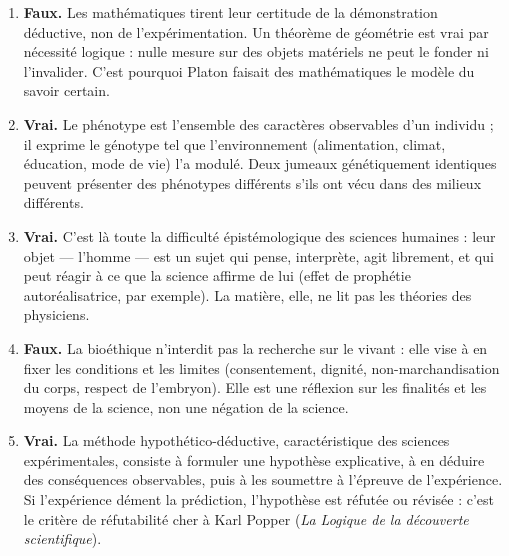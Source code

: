 \documentclass[11pt]{article}
\begin{document}
\begin{corrige}
\begin{enumerate}
\item \textbf{Faux.} Les mathématiques tirent leur certitude de la démonstration déductive, non de l'expérimentation. Un théorème de géométrie est vrai par nécessité logique : nulle mesure sur des objets matériels ne peut le fonder ni l'invalider. C'est pourquoi Platon faisait des mathématiques le modèle du savoir certain.
\item \textbf{Vrai.} Le phénotype est l'ensemble des caractères observables d'un individu ; il exprime le génotype tel que l'environnement (alimentation, climat, éducation, mode de vie) l'a modulé. Deux jumeaux génétiquement identiques peuvent présenter des phénotypes différents s'ils ont vécu dans des milieux différents.
\item \textbf{Vrai.} C'est là toute la difficulté épistémologique des sciences humaines : leur objet — l'homme — est un sujet qui pense, interprète, agit librement, et qui peut réagir à ce que la science affirme de lui (effet de prophétie autoréalisatrice, par exemple). La matière, elle, ne lit pas les théories des physiciens.
\item \textbf{Faux.} La bioéthique n'interdit pas la recherche sur le vivant : elle vise à en fixer les conditions et les limites (consentement, dignité, non-marchandisation du corps, respect de l'embryon). Elle est une réflexion sur les finalités et les moyens de la science, non une négation de la science.
\item \textbf{Vrai.} La méthode hypothético-déductive, caractéristique des sciences expérimentales, consiste à formuler une hypothèse explicative, à en déduire des conséquences observables, puis à les soumettre à l'épreuve de l'expérience. Si l'expérience dément la prédiction, l'hypothèse est réfutée ou révisée : c'est le critère de réfutabilité cher à Karl Popper (\emph{La Logique de la découverte scientifique}).
\end{enumerate}
\end{corrige}
\end{document}
